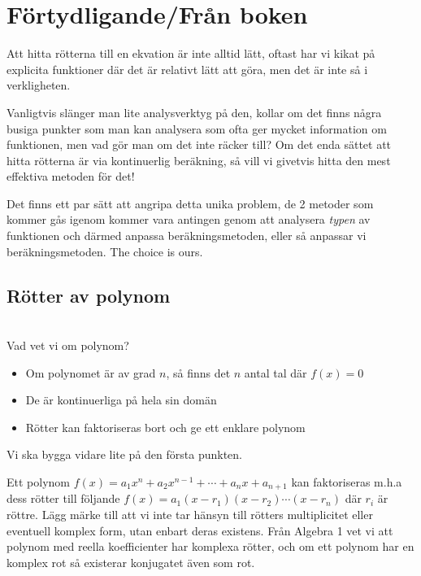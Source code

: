 \section{Förtydligande/Från boken}

\noindent Att hitta rötterna till en ekvation är inte alltid lätt, oftast har vi kikat på explicita funktioner där det är relativt lätt att göra, men det är inte så i verkligheten. 
\par\bigskip
\noindent Vanligtvis slänger man lite analysverktyg på den, kollar om det finns några busiga punkter som man kan analysera som ofta ger mycket information om funktionen, men vad gör man om det inte räcker till? Om det enda sättet att hitta rötterna är via kontinuerlig beräkning, så vill vi givetvis hitta den mest effektiva metoden för det! 
\par\bigskip
\noindent Det finns ett par sätt att angripa detta unika problem, de 2 metoder som kommer gås igenom kommer vara antingen genom att analysera \textit{typen} av funktionen och därmed anpassa beräkningsmetoden, eller så anpassar vi beräkningsmetoden. The choice is ours.
\par\bigskip

\subsection{Rötter av polynom}\hfill\\

\noindent Vad vet vi om polynom?
\begin{itemize}
  \item Om polynomet är av grad $n$, så finns det $n$ antal tal där $f(x)=0$
  \item De är kontinuerliga på hela sin domän
  \item Rötter kan faktoriseras bort och ge ett enklare polynom 
\end{itemize}
\par\bigskip
\noindent Vi ska bygga vidare lite på den första punkten.
\par\bigskip
\noindent Ett polynom $f(x) = a_1x^n+a_2x^{n-1}+\cdots+a_nx+a_{n+1}$ kan faktoriseras m.h.a dess rötter till följande $f(x) = a_1(x-r_1 )(x-r_2)\cdots(x-r_n)$ där $r_i$ är röttre. Lägg märke till att vi inte tar hänsyn till rötters multiplicitet eller eventuell komplex form, utan enbart deras existens. Från Algebra 1 vet vi att polynom med reella koefficienter har komplexa rötter, och om ett polynom har en komplex rot så existerar konjugatet även som rot. 
\par\bigskip


